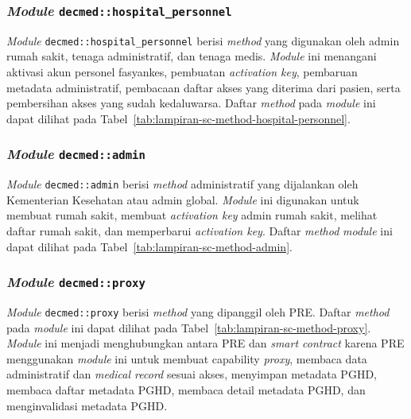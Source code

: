 \subsubsection{\textit{Module} \texttt{decmed::hospital\_personnel}}\label{subsubsec:sc-module-hospital-personnel}

\textit{Module} \texttt{decmed::hospital\_personnel} berisi \textit{method} yang digunakan oleh admin rumah sakit, tenaga administratif, dan tenaga medis. 
\textit{Module} ini menangani aktivasi akun personel fasyankes, pembuatan \textit{activation key}, pembaruan metadata administratif, pembacaan daftar akses yang diterima dari pasien, serta pembersihan akses yang sudah kedaluwarsa. 
Daftar \textit{method} pada \textit{module} ini dapat dilihat pada Tabel~\ref{tab:lampiran-sc-method-hospital-personnel}.


\subsubsection{\textit{Module} \texttt{decmed::admin}}\label{subsubsec:sc-module-admin}

\textit{Module} \texttt{decmed::admin} berisi \textit{method} administratif yang dijalankan oleh Kementerian Kesehatan atau admin global. 
\textit{Module} ini digunakan untuk membuat rumah sakit, membuat \textit{activation key} admin rumah sakit, melihat daftar rumah sakit, dan memperbarui \textit{activation key}. 
Daftar \textit{method} \textit{module} ini dapat dilihat pada Tabel~\ref{tab:lampiran-sc-method-admin}.

\subsubsection{\textit{Module} \texttt{decmed::proxy}}\label{subsubsec:sc-module-proxy}

\textit{Module} \texttt{decmed::proxy} berisi \textit{method} yang dipanggil oleh PRE\@. 
Daftar \textit{method} pada \textit{module} ini dapat dilihat pada Tabel~\ref{tab:lampiran-sc-method-proxy}. 
\textit{Module} ini menjadi menghubungkan antara PRE dan \textit{smart contract} karena PRE menggunakan \textit{module} ini untuk membuat capability \textit{proxy}, membaca data administratif dan \textit{medical record} sesuai akses, menyimpan metadata PGHD, membaca daftar metadata PGHD, membaca detail metadata PGHD, dan menginvalidasi metadata PGHD\@.

